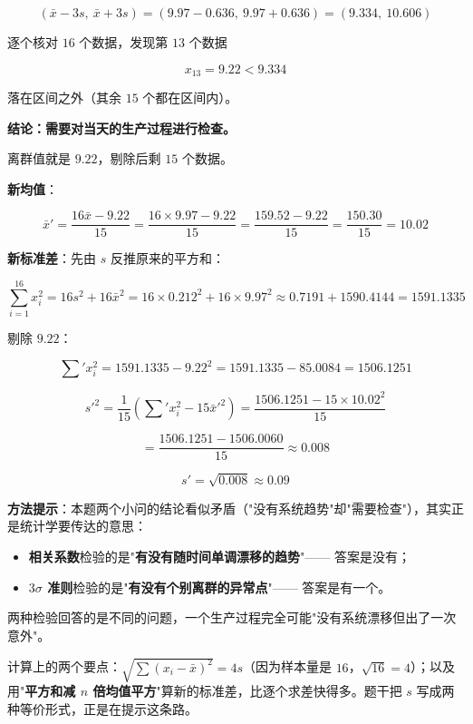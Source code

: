 \begin{answer}
\nopagebreak[4]
\[(\bar x-3s,\ \bar x+3s)=(9.97-0.636,\ 9.97+0.636)=(9.334,\ 10.606)\]

逐个核对 $16$ 个数据，发现第 $13$ 个数据

\nopagebreak[4]
\[x_{13}=9.22<9.334\]

落在区间之外（其余 $15$ 个都在区间内）。

\textbf{结论：需要对当天的生产过程进行检查。}


离群值就是 $9.22$，剔除后剩 $15$ 个数据。

\textbf{新均值}：

\nopagebreak[4]
\[\bar x'=\frac{16\bar x-9.22}{15}=\frac{16\times9.97-9.22}{15}=\frac{159.52-9.22}{15}=\frac{150.30}{15}=10.02\]

\textbf{新标准差}：先由 $s$ 反推原来的平方和：

\nopagebreak[4]
\[\sum_{i=1}^{16}x_i^{2}=16s^{2}+16\bar x^{2}=16\times0.212^{2}+16\times9.97^{2}\approx0.7191+1590.4144=1591.1335\]

剔除 $9.22$：

\nopagebreak[4]
\[\sum{}'x_i^{2}=1591.1335-9.22^{2}=1591.1335-85.0084=1506.1251\]

\nopagebreak[4]
\[s'^{2}=\frac1{15}\left(\sum{}'x_i^{2}-15\bar x'^{2}\right)=\frac{1506.1251-15\times10.02^{2}}{15}\]

\nopagebreak[4]
\[=\frac{1506.1251-1506.0060}{15}\approx0.008\]

\nopagebreak[4]
\[s'=\sqrt{0.008}\approx0.09\]

\begin{gktip}
\textbf{方法提示}：本题两个小问的结论看似矛盾（"没有系统趋势"却"需要检查"），其实正是统计学要传达的意思：

\begin{itemize}
\item \textbf{相关系数}检验的是"\textbf{有没有随时间单调漂移的趋势}"—— 答案是没有；
\item \textbf{$3\sigma$ 准则}检验的是"\textbf{有没有个别离群的异常点}"—— 答案是有一个。
\end{itemize}

两种检验回答的是不同的问题，一个生产过程完全可能"没有系统漂移但出了一次意外"。

计算上的两个要点：$\sqrt{\sum\left(x_i-\bar x\right)^{2}}=4s$（因为样本量是 $16$，$\sqrt{16}=4$）；以及用"\textbf{平方和减 $n$ 倍均值平方}"算新的标准差，比逐个求差快得多。题干把 $s$ 写成两种等价形式，正是在提示这条路。
\end{gktip}



\par\medskip

\end{answer}
